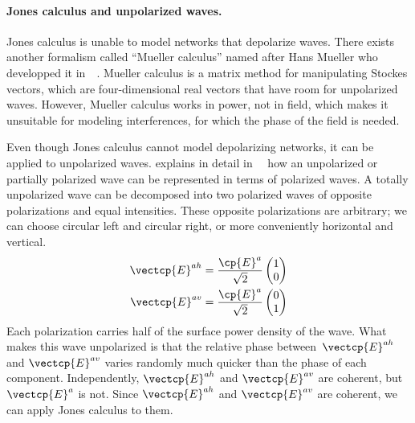 \paragraph{Jones calculus and unpolarized waves.}
\label{sec:jones_unpolarized}
Jones calculus is unable to model networks that depolarize waves.
There exists another formalism called ``Mueller calculus'' named after Hans Mueller who developped it in~\citeyear{mueller1943memorandum}~\cite{mueller1943memorandum}.
Mueller calculus is a matrix method for manipulating Stockes vectors, which are four-dimensional real vectors that have room for unpolarized waves.
However, Mueller calculus works in power, not in field, which makes it unsuitable for modeling interferences, for which the phase of the field is needed.

Even though Jones calculus cannot model depolarizing networks, it can be applied to unpolarized waves.
\citeauthor{goodman1985statistical} explains in detail in~~\cite{goodman1985statistical}
how an unpolarized or partially polarized wave can be represented in terms of polarized waves.
A totally unpolarized wave can be decomposed into two polarized waves of opposite polarizations and equal intensities.
These opposite polarizations are arbitrary; we can choose circular left and circular right, or more conveniently horizontal and vertical.
\begin{equation}
    \begin{aligned}
        \vectcp{E}^{ah}
        &=
        \frac{\cp{E}^a}{\sqrt{2}}
        \begin{pmatrix}
            1 \\ 0
        \end{pmatrix}
        \\
        \vectcp{E}^{av}
        &=
        \frac{\cp{E}^a}{\sqrt{2}}
        \begin{pmatrix}
            0 \\ 1
        \end{pmatrix}
    \end{aligned}
\end{equation}
Each polarization carries half of the surface power density of the wave.
What makes this wave unpolarized is that the relative phase between~$\vectcp{E}^{ah}$ and $\vectcp{E}^{av}$ varies randomly much quicker than the phase of each component.
Independently, $\vectcp{E}^{ah}$ and $\vectcp{E}^{av}$ are coherent, but $\vectcp{E}^a$ is not.
Since $\vectcp{E}^{ah}$ and $\vectcp{E}^{av}$ are coherent, we can apply Jones calculus to them.
